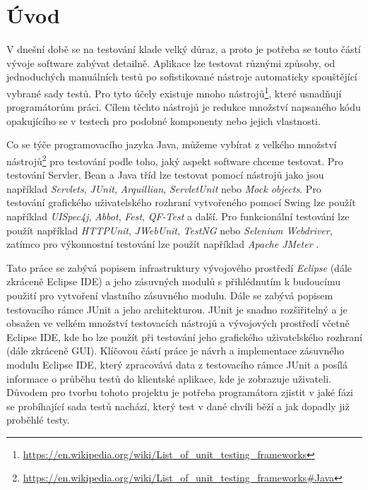\chapter{Úvod}                                                            %
V dnešní době se na testování klade velký důraz, a proto je potřeba se touto částí vývoje software zabývat detailně. Aplikace lze testovat různými způsoby, od jednoduchých manuálních testů po sofistikované nástroje automaticky spouštějící vybrané sady testů. Pro tyto účely existuje mnoho nástrojů\footnote{\url{https://en.wikipedia.org/wiki/List_of_unit_testing_frameworks}}, které usnadňují programátorům práci. Cílem těchto nástrojů je redukce množství napsaného kódu opakujícího se v testech pro podobné komponenty nebo jejich vlastnosti.

Co se týče programovacího jazyka Java, můžeme vybírat z velkého množství nástrojů\footnote{\url{https://en.wikipedia.org/wiki/List_of_unit_testing_frameworks\#Java}} pro testování podle toho, jaký aspekt software chceme testovat. Pro testování Servler, Bean a Java tříd lze testovat pomocí nástrojů jako jsou například \emph{Servlets}, \emph{JUnit}, \emph{Arquillian}, \emph{ServletUnit} nebo \emph{Mock objects}. Pro testování grafického uživatelského rozhraní vytvořeného pomocí Swing lze použít například \emph{UISpec4j}, \emph{Abbot}, \emph{Fest}, \emph{QF-Test} a další. Pro funkcionální testování lze použít například \emph{HTTPUnit}, \emph{JWebUnit}, \emph{TestNG} nebo \emph{Selenium Webdriver}, zatímco pro výkonnostní testování lze použít například \emph{Apache JMeter} \cite{softwaretestinghelp}.

Tato práce se zabývá popisem infrastruktury vývojového prostředí \emph{Eclipse} (dále zkráceně Eclipse IDE) a jeho zásuvných modulů s přihlédnutím k budoucímu použití pro vytvoření vlastního zásuvného modulu. Dále se zabývá popisem testovacího rámce JUnit a jeho architekturou. JUnit je snadno rozšiřitelný a je obsažen ve velkém množství testovacích nástrojů a vývojových prostředí včetně Eclipse IDE, kde ho lze použít při testování jeho grafického uživatelského rozhraní (dále zkráceně GUI). Klíčovou částí práce je návrh a implementace zásuvného modulu Eclipse IDE, který zpracovává data z testovacího rámce JUnit a posílá informace o průběhu testů do klientské aplikace, kde je zobrazuje uživateli. Důvodem pro tvorbu tohoto projektu je potřeba programátora zjistit v jaké fázi se probíhající sada testů nachází, který test v dané chvíli běží a jak dopadly již proběhlé testy.
